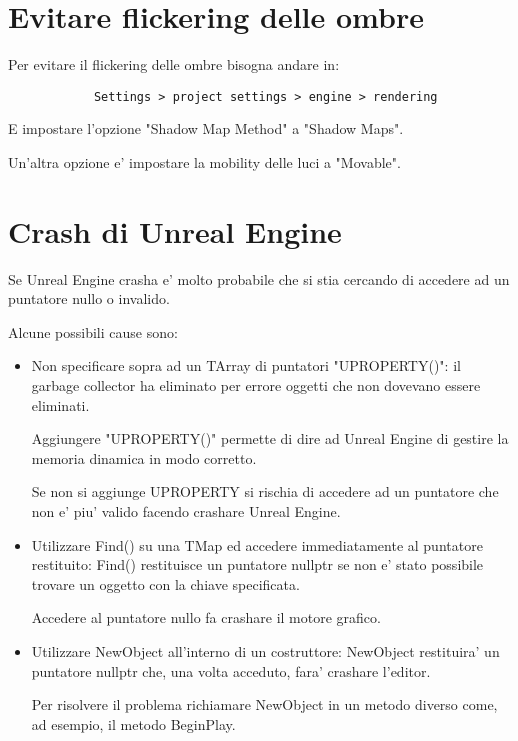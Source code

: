     \section{Evitare flickering delle ombre}
        Per evitare il flickering delle ombre bisogna andare in:

        \begin{lstlisting}
            Settings > project settings > engine > rendering
        \end{lstlisting}

        E impostare l'opzione "Shadow Map Method" a "Shadow Maps".

        Un'altra opzione e' impostare la mobility delle luci a "Movable".


    \section{Crash di Unreal Engine}
        Se Unreal Engine crasha e' molto probabile che si stia cercando di accedere ad un puntatore nullo o invalido.

        Alcune possibili cause sono:
        \begin{itemize}
            \item Non specificare sopra ad un TArray di puntatori "UPROPERTY()": il garbage collector ha eliminato per errore oggetti che non dovevano essere eliminati.

                Aggiungere "UPROPERTY()" permette di dire ad Unreal Engine di gestire la memoria dinamica in modo corretto.

                Se non si aggiunge UPROPERTY si rischia di accedere ad un puntatore che non e' piu' valido facendo crashare Unreal Engine.

            \item Utilizzare Find() su una TMap ed accedere immediatamente al puntatore restituito: Find() restituisce un puntatore nullptr se non e' stato possibile trovare un oggetto con la chiave specificata.

                Accedere al puntatore nullo fa crashare il motore grafico.

            \item Utilizzare NewObject all'interno di un costruttore: NewObject restituira' un puntatore nullptr che, una volta acceduto, fara' crashare l'editor.

                Per risolvere il problema richiamare NewObject in un metodo diverso come, ad esempio, il metodo BeginPlay.
        \end{itemize}


